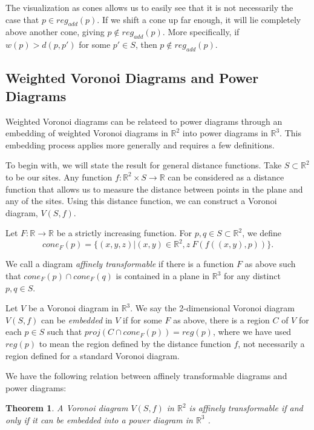 \documentclass[12pt]{article}
\newtheorem{theorem}{Theorem}[section]
\newcommand{\R}{\mathbb{R}}
\begin{document}
The visualization as cones allows us to easily see that it is not necessarily the case that $p \in reg_{add}(p)$. If we shift a cone up far enough, it
will lie completely above another cone, giving $p \notin reg_{add}(p)$. More specifically, if $w(p) > d(p,p')$ for some $p' \in S$, then $p \notin
reg_{add}(p)$.

\subsection{Weighted Voronoi Diagrams and Power Diagrams}

Weighted Voronoi diagrams can be relateed to power diagrams through an embedding of weighted Voronoi diagrams in $\R^2$ into power diagrams in $\R^3$.
This embedding process applies more generally and requires a few definitions.

To begin with, we will state the result for general distance functions. Take $S \subset \R^2$ to be our sites. Any function $f: \R^2 \times S \to \R$
can be considered as a distance function that allows us to measure the distance between points in the plane and any of the sites. Using this distance
function, we can construct a Voronoi diagram, $V(S,f)$.

Let $F: \R \to \R$ be a strictly increasing function. For $p,q \in S \subset \R^2$, we define
\[ cone_F(p) = \{ (x,y,z) | (x,y) \in \R^2, z \ F( f( (x,y), p) ) \}. \]

We call a diagram \textit{affinely transformable} if there is a function $F$ as above such that $cone_F(p) \cap cone_F(q)$ is contained in a plane in $\R^3$ for any distinct
$p,q \in S$.

Let $V$ be a Voronoi diagram in $\R^3$. We say the 2-dimensional Voronoi diagram $V(S,f)$ can be \textit{embedded} in $V$ if for some $F$ as above,
there is a region $C$ of $V$ for each $p \in S$ such that $proj( C \cap cone_F(p)) = reg(p)$, where we have used $reg(p)$ to mean the region defined
by the distance function $f$, not necessarily a region defined for a standard Voronoi diagram.

We have the following relation between affinely transformable diagrams and power diagrams:

\begin{theorem}
  \label{thm:affine}
  A Voronoi diagram $V(S,f)$ in $\R^2$ is affinely transformable if and only if it can be embedded into a power diagram in $\R^3$
  \cite{aurenhammer_additive}.
\end{theorem}
\end{document}
